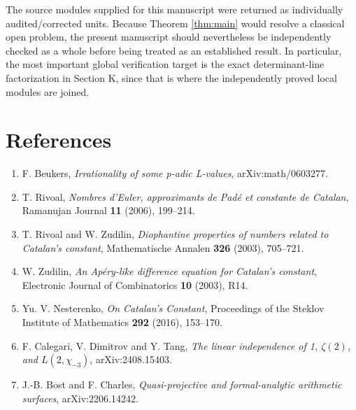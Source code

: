 \documentclass[
  10pt,
  letterpaper,
]{article}
\providecommand{\tightlist}{%
  \setlength{\itemsep}{0pt}\setlength{\parskip}{0pt}}
\theoremstyle{definition}
\theoremstyle{remark}
\begin{document}
The source modules supplied for this manuscript were returned as
individually audited/corrected units. Because Theorem \ref{thm:main}
would resolve a classical open problem, the present manuscript should
nevertheless be independently checked as a whole before being treated as
an established result. In particular, the most important global
verification target is the exact determinant-line factorization in
Section K, since that is where the independently proved local modules
are joined.

\section{References}\label{references}

\begin{enumerate}
\def\labelenumi{\arabic{enumi}.}
\tightlist
\item
  F. Beukers, \emph{Irrationality of some p-adic L-values},
  arXiv:math/0603277.
\item
  T. Rivoal, \emph{Nombres d'Euler, approximants de Padé et constante de
  Catalan}, Ramanujan Journal \textbf{11} (2006), 199--214.
\item
  T. Rivoal and W. Zudilin, \emph{Diophantine properties of numbers
  related to Catalan's constant}, Mathematische Annalen \textbf{326}
  (2003), 705--721.
\item
  W. Zudilin, \emph{An Apéry-like difference equation for Catalan's
  constant}, Electronic Journal of Combinatorics \textbf{10} (2003),
  R14.
\item
  Yu. V. Nesterenko, \emph{On Catalan's Constant}, Proceedings of the
  Steklov Institute of Mathematics \textbf{292} (2016), 153--170.
\item
  F. Calegari, V. Dimitrov and Y. Tang, \emph{The linear independence of
  1, \(\zeta(2)\), and \(L(2,\chi_{-3})\)}, arXiv:2408.15403.
\item
  J.-B. Bost and F. Charles, \emph{Quasi-projective and formal-analytic
  arithmetic surfaces}, arXiv:2206.14242.
\end{enumerate}
\end{document}
